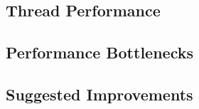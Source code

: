 \documentclass[12pt]{article}
\begin{document}
\subsection{Thread Performance}
\subsection{Performance Bottlenecks}
\subsection{Suggested Improvements}



\end{document}
